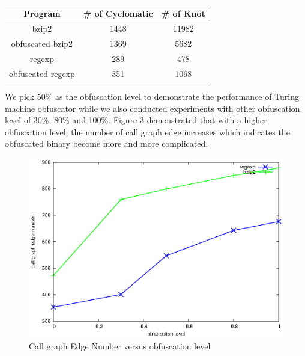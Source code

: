 \documentclass[lnicst]{svmultln}
\begin{document}
\begin{center}
 \begin{tabular}{|c | c | c |} 
 \hline 
 Program & \# of Cyclomatic & \# of Knot \\
 \hline
bzip2 & 1448 & 11982  \\ 
 \hline
obfuscated bzip2 & 1369 & 5682  \\
 \hline
regexp & 289 & 478 \\ 
 \hline
obfuscated regexp & 351 & 1068 \\
 \hline
\end{tabular}
\end{center}

We pick 50\% as the obfuscation level to demonstrate the performance of Turing machine obfuscator while we also conducted experiments with other obfuscation level of 30\%, 80\% and 100\%. Figure 3 demonstrated that with a higher obfuscation level,  the number of call graph edge increases which indicates the obfuscated binary become more and more complicated. 
\begin{figure}
  \includegraphics[width=0.9\linewidth]{cg.eps}
  \caption{Call graph Edge Number versus obfuscation level}
  \label{Figure 3}
\end{figure}
\end{document}
